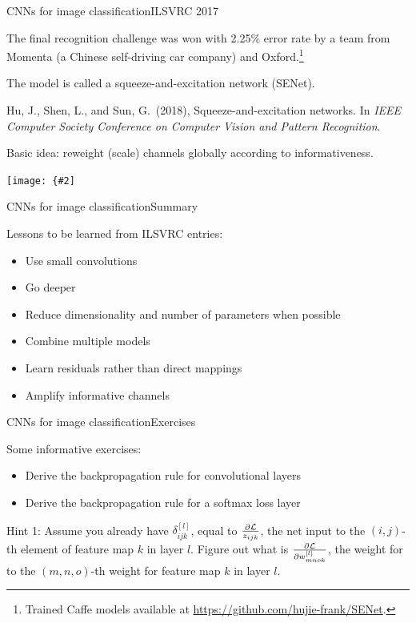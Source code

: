 \documentclass{beamer}
\newcommand{\myfig}[3]{\centerline{\texttt{[image: \{\#2]}}}
\begin{document}
\begin{frame}{CNNs for image classification}{ILSVRC 2017}

  The final recognition challenge was won with 2.25\% error rate by a
  team from Momenta (a Chinese self-driving car company) and
  Oxford.\footnote{Trained Caffe models available at
    \url{https://github.com/hujie-frank/SENet}.}

  \medskip

  The model is called a squeeze-and-excitation network (SENet).
  
  \medskip

  Hu, J., Shen, L., and Sun, G.\ (2018), Squeeze-and-excitation
  networks.  In \textit{IEEE Computer Society Conference on Computer
    Vision and Pattern Recognition}.

  \medskip

  Basic idea: reweight (scale) channels globally according to
  informativeness.

  \medskip

  \myfig{4in}{hu-fig1}{Hu, Shen, and Sun (2018), Fig.\ 1}

\end{frame}


\begin{frame}{CNNs for image classification}{Summary}

  Lessons to be learned from ILSVRC entries:
  \begin{itemize}
  \item Use small convolutions
  \item Go deeper
  \item Reduce dimensionality and number of parameters when possible
  \item Combine multiple models
  \item Learn residuals rather than direct mappings
  \item Amplify informative channels
  \end{itemize}
  
\end{frame}


\begin{frame}{CNNs for image classification}{Exercises}

Some informative exercises:
\begin{itemize}
\item Derive the backpropagation rule for convolutional layers
\item Derive the backpropagation rule for a softmax loss layer
\end{itemize}

\medskip

Hint 1:
Assume you already have $\delta^{[l]}_{ijk}$, equal to
$\frac{\partial \cal L}{z_{ijk}}$, the net input to the $(i,j)$-th
element of feature map $k$ in layer $l$. Figure out what is
$\frac{\partial \cal L}{\partial w^{[l]}_{mnok}}$, the weight
for to the $(m,n,o)$-th weight for feature map $k$ in layer $l$.

\end{frame}
\end{document}
